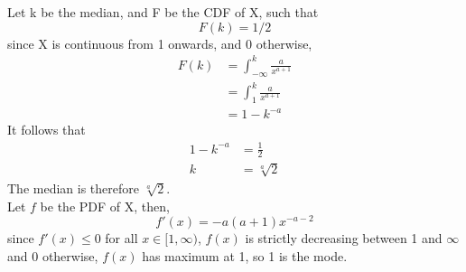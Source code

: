 Let k be the median, and F be the CDF of X, such that
\[F(k) = 1/2\]
since X is continuous from 1 onwards, and 0 otherwise,
\begin{align*}
F(k) &= \int_{-\infty}^{k}{\frac{a}{x^{a+1}}} \\
&= \int_{1}^{k}{\frac{a}{x^{a+1}}} \\
&= 1 - k^{-a}
\end{align*}
It follows that
\begin{align*}
1-k^{-a} &= \frac{1}{2} \\
k &= \sqrt[a]{2}
\end{align*}
The median is therefore \(\sqrt[a]{2}\). \\ 

Let $f$ be the PDF of X, then,
\[f'(x) = -a(a+1)x^{-a-2}\]
since $f'(x) \le 0$ for all $x \in [1,\infty)$, $f(x)$ is strictly decreasing between 1 and \(\infty\) and 0 otherwise, $f(x)$ has maximum at 1, so 1 is the mode.
